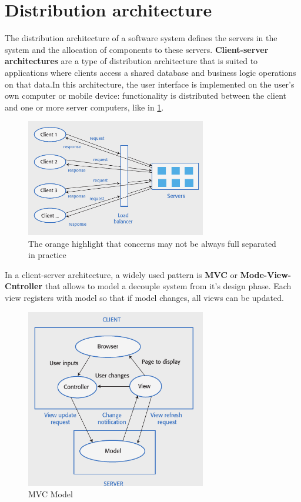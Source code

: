 \documentclass[10pt,a4paper]{report}
\begin{document}
\section{Distribution architecture}
The distribution architecture of a software system defines the servers in
the system and the allocation of components to these servers. \textbf{Client-server architectures} are a type of distribution architecture that is suited to applications where clients access a shared database and
business logic operations on that data.In this architecture, the user interface is implemented on the user’s own computer or mobile device: functionality is distributed between the client and one or more server
computers, like in \ref{image29}.
 \begin{figure}[h]
	\centering
	\includegraphics[width=0.7\textwidth]{image29}
	\caption{The orange highlight that concerns may not be always full separated in practice}
	\label{image29}
\end{figure}

In a client-server architecture, a widely used pattern is \textbf{MVC} or \textbf{Mode-View-Cntroller} that allows to model a decouple system from it's design phase. Each view registers with model so that if model changes, all views can be updated.
 \begin{figure}[h]
	\centering
	\includegraphics[width=0.7\textwidth]{image30}
	\caption{MVC Model}
	\label{image30}
\end{figure}
\end{document}
